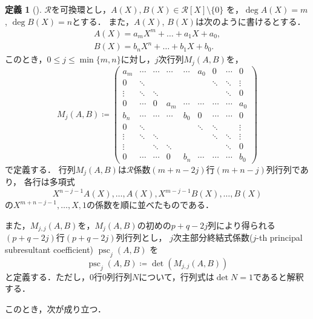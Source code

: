 \documentclass[uplatex, dvipdfmx]{jsarticle}
\numberwithin{equation}{section}
\DeclareMathOperator{\psc}{psc}
\theoremstyle{definition}
\newtheorem{definition}{定義}[section]
\begin{document}
\begin{definition}[{\cite[Section 2]{MR0403962}}]
     $\mathcal{R}$を可換環とし，$A(X), B(X) \in \mathcal{R}[X] \setminus \{0\}$ を，$\deg A(X) = m$, $\deg B(X) = n$とする．
     また，$A(X)$, $B(X)$は次のように書けるとする．
     \begin{align}
          A(X) = a_m X^m + \dots + a_1 X + a_0, \\
          B(X) = b_n X^n + \dots + b_1 X + b_0.
     \end{align}
     このとき，$0 \leq j \leq \min\{m, n\}$に対し，$j$次行列$M_j(A, B)$を，
     \begin{equation}
          M_j(A, B) \coloneqq
          \begin{pmatrix}
               a_m    & \cdots & \cdots & \cdots & \cdots & a_0    & 0      & \cdots & 0      \\
               0      & \ddots &        &        &        &        & \ddots & \ddots & \vdots \\
               \vdots & \ddots & \ddots &        &        &        &        & \ddots & 0      \\
               0      & \cdots & 0      & a_m    & \cdots & \cdots & \cdots & \cdots & a_0    \\
               b_n    & \cdots & \cdots & \cdots & b_0    & 0      & \cdots & \cdots & 0      \\
               0      & \ddots &        &        &        & \ddots & \ddots &        & \vdots \\
               \vdots & \ddots & \ddots &        &        &        & \ddots & \ddots & \vdots \\
               \vdots &        & \ddots & \ddots &        &        &        & \ddots & 0      \\
               0      & \cdots & \cdots & 0      & b_n    & \cdots & \cdots & \cdots & b_0      
          \end{pmatrix}
     \end{equation}
     で定義する．
     行列$M_j(A,B)$は$\mathcal{R}$係数$(m+n-2j)$行$(m+n-j)$列行列であり，
     各行は多項式
     \begin{equation}
          X^{n-j-1}A(X), \dots, A(X), X^{m-j-1}B(X), \dots, B(X)
     \end{equation}
     の$X^{m+n-j-1}, \dots, X, 1$の係数を順に並べたものである．

     また，$M_{j,j}(A,B)$を，$M_j(A,B)$の初めの$p+q-2j$列により得られる$(p+q-2j)$行$(p+q-2j)$列行列とし，
     $j$次主部分終結式係数($j$-th principal subresultant coefficient) $\psc_j(A,B)$ を
     \begin{equation}
          \psc_j(A,B) \coloneqq \det(M_{j,j}(A,B))
     \end{equation}
     と定義する．ただし，$0$行$0$列行列$N$について，行列式は$\det N = 1$であると解釈する．
\end{definition}
このとき，次が成り立つ．
\end{document}
